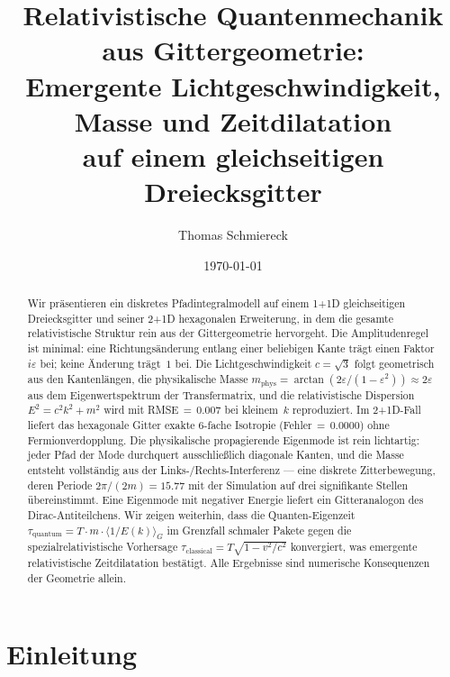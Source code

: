 \documentclass[twocolumn,showpacs,preprintnumbers,amsmath,amssymb]{revtex4-2}
\newcommand{\eps}{\varepsilon}
\newcommand{\mphys}{m_{\mathrm{phys}}}
\newcommand{\tauq}{\tau_{\mathrm{quantum}}}
\newcommand{\taucl}{\tau_{\mathrm{classical}}}
\newcommand{\avg}[1]{\langle #1 \rangle}
\begin{document}
\title{Relativistische Quantenmechanik aus Gittergeometrie:\\
Emergente Lichtgeschwindigkeit, Masse und Zeitdilatation\\
auf einem gleichseitigen Dreiecksgitter}

\author{Thomas Schmiereck}

\date{\today}

\begin{abstract}
Wir präsentieren ein diskretes Pfadintegralmodell auf einem \mbox{1\!+\!1D}
gleichseitigen Dreiecksgitter und seiner \mbox{2\!+\!1D} hexagonalen
Erweiterung, in dem die gesamte relativistische Struktur rein aus der
Gittergeometrie hervorgeht.
Die Amplitudenregel ist minimal: eine Richtungsänderung entlang einer beliebigen
Kante trägt einen Faktor $i\eps$ bei; keine Änderung trägt~$1$ bei.
Die Lichtgeschwindigkeit $c = \sqrt{3}$ folgt geometrisch aus den Kantenlängen,
die physikalische Masse $\mphys = \arctan(2\eps/(1{-}\eps^2)) \approx 2\eps$ aus
dem Eigenwertspektrum der Transfermatrix, und die relativistische Dispersion
$E^2 = c^2 k^2 + m^2$ wird mit RMSE\,$=\,0.007$ bei kleinem~$k$ reproduziert.
Im \mbox{2\!+\!1D}-Fall liefert das hexagonale Gitter exakte 6-fache Isotropie
(Fehler\,$=\,0.0000$) ohne Fermionverdopplung.
Die physikalische propagierende Eigenmode ist rein lichtartig: jeder Pfad der
Mode durchquert ausschließlich diagonale Kanten, und die Masse entsteht
vollständig aus der Links-/Rechts-Interferenz --- eine diskrete Zitterbewegung,
deren Periode $2\pi/(2m) = 15.77$ mit der Simulation auf drei signifikante
Stellen übereinstimmt.
Eine Eigenmode mit negativer Energie liefert ein Gitteranalogon des
Dirac-Antiteilchens.
Wir zeigen weiterhin, dass die Quanten-Eigenzeit
$\tauq = T \cdot m \cdot \avg{1/E(k)}_G$ im Grenzfall schmaler Pakete gegen
die spezialrelativistische Vorhersage $\taucl = T\sqrt{1 - v^2/c^2}$
konvergiert, was emergente relativistische Zeitdilatation bestätigt.
Alle Ergebnisse sind numerische Konsequenzen der Geometrie allein.
\end{abstract}

\maketitle

\section{Einleitung}
\label{sec:intro}
\end{document}
